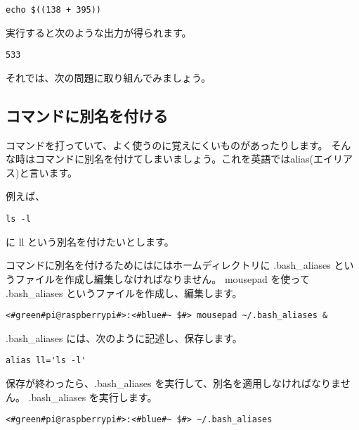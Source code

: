 \begin{lstlisting}[caption=echo コマンドを使った例, label=echo]
echo $((138 + 395))
\end{lstlisting}

実行すると次のような出力が得られます。

\begin{lstlisting}[caption=echo コマンドを実行した結果, label=echo_result]
533
\end{lstlisting}

それでは、次の問題に取り組んでみましょう。

\begin{enumerate}
\end{enumerate}

\subsection{コマンドに別名を付ける}

コマンドを打っていて、よく使うのに覚えにくいものがあったりします。
そんな時はコマンドに別名を付けてしまいましょう。これを英語ではalias(エイリアス)と言います。

例えば、

\begin{lstlisting}[caption=lsコマンド, label=lsAlias]
    ls -l
\end{lstlisting}

に ll という別名を付けたいとします。

コマンドに別名を付けるためにはにはホームディレクトリに .bash{\_}aliases というファイルを作成し編集しなければなりません。
mousepad を使って .bash{\_}aliases というファイルを作成し、編集します。
\begin{lstlisting}[caption=.bashaliasesを開く, label=openBashAliases]
    <#green#pi@raspberrypi#>:<#blue#~ $#> mousepad ~/.bash_aliases &
\end{lstlisting}

.bash{\_}aliases には、次のように記述し、保存します。
\begin{lstlisting}[caption=.bashaliasesの中身, label=bashAliasesContents]
    alias ll='ls -l'
\end{lstlisting}

保存が終わったら、.bash{\_}aliases を実行して、別名を適用しなければなりません。
.bash{\_}aliases を実行します。
\begin{lstlisting}[caption=.bashaliasesを実行, label=executeBashAliases]
    <#green#pi@raspberrypi#>:<#blue#~ $#> ~/.bash_aliases
\end{lstlisting}


